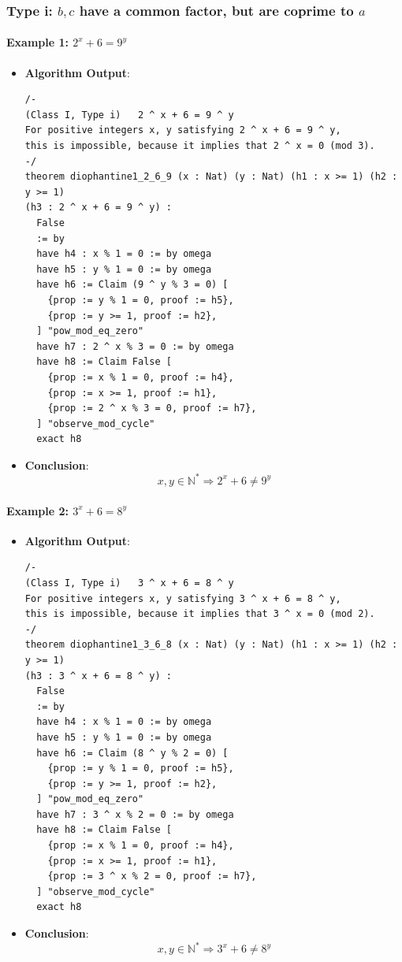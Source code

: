 \documentclass{article}
\begin{document}
\subsubsection{Type i: $b, c$ have a common factor, but are coprime to $a$}
\paragraph{Example 1: $2^x+6=9^y$}
\begin{itemize}
    \item \textbf{Algorithm Output}:
    \begin{verbatim}
/-
(Class I, Type i)   2 ^ x + 6 = 9 ^ y
For positive integers x, y satisfying 2 ^ x + 6 = 9 ^ y,
this is impossible, because it implies that 2 ^ x = 0 (mod 3).
-/
theorem diophantine1_2_6_9 (x : Nat) (y : Nat) (h1 : x >= 1) (h2 : y >= 1) 
(h3 : 2 ^ x + 6 = 9 ^ y) :      
  False
  := by
  have h4 : x % 1 = 0 := by omega
  have h5 : y % 1 = 0 := by omega
  have h6 := Claim (9 ^ y % 3 = 0) [
    {prop := y % 1 = 0, proof := h5},
    {prop := y >= 1, proof := h2},
  ] "pow_mod_eq_zero"
  have h7 : 2 ^ x % 3 = 0 := by omega
  have h8 := Claim False [
    {prop := x % 1 = 0, proof := h4},
    {prop := x >= 1, proof := h1},
    {prop := 2 ^ x % 3 = 0, proof := h7},
  ] "observe_mod_cycle"
  exact h8
    \end{verbatim}
    \item \textbf{Conclusion}:
    \[ x, y \in \mathbb{N}^* \Rightarrow 2^x + 6 \neq 9^y \]
\end{itemize}

\paragraph{Example 2: $3^x+6=8^y$}
\begin{itemize}
\item \textbf{Algorithm Output}:
    \begin{verbatim}
/-
(Class I, Type i)   3 ^ x + 6 = 8 ^ y
For positive integers x, y satisfying 3 ^ x + 6 = 8 ^ y,
this is impossible, because it implies that 3 ^ x = 0 (mod 2).
-/
theorem diophantine1_3_6_8 (x : Nat) (y : Nat) (h1 : x >= 1) (h2 : y >= 1) 
(h3 : 3 ^ x + 6 = 8 ^ y) :      
  False
  := by
  have h4 : x % 1 = 0 := by omega
  have h5 : y % 1 = 0 := by omega
  have h6 := Claim (8 ^ y % 2 = 0) [
    {prop := y % 1 = 0, proof := h5},
    {prop := y >= 1, proof := h2},
  ] "pow_mod_eq_zero"
  have h7 : 3 ^ x % 2 = 0 := by omega
  have h8 := Claim False [
    {prop := x % 1 = 0, proof := h4},
    {prop := x >= 1, proof := h1},
    {prop := 3 ^ x % 2 = 0, proof := h7},
  ] "observe_mod_cycle"
  exact h8
    \end{verbatim}
    \item \textbf{Conclusion}:
    \[ x, y \in \mathbb{N}^* \Rightarrow 3^x + 6 \neq 8^y \]
\end{itemize}
\end{document}
